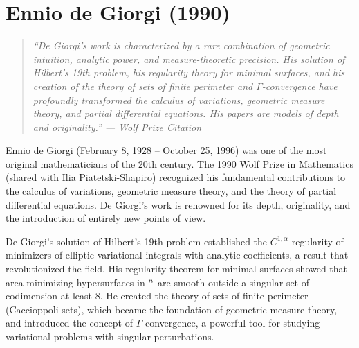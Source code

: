 \let\R\relax
\newcommand{\R}{\mathbb{R}}
\let\C\relax
\newcommand{\C}{\mathbb{C}}
\let\N\relax
\newcommand{\N}{\mathbb{N}}
\let\Z\relax
\newcommand{\Z}{\mathbb{Z}}
\let\Q\relax
\newcommand{\Q}{\mathbb{Q}}
\let\SO\relax
\newcommand{\SO}{\operatorname{SO}}
\let\SL\relax
\newcommand{\SL}{\operatorname{SL}}
\let\GL\relax
\newcommand{\GL}{\operatorname{GL}}
\let\St\relax
\newcommand{\St}{\operatorname{St}}
\let\GV\relax
\newcommand{\GV}{\operatorname{GV}}
\let\E\relax
\newcommand{\E}{\operatorname{E}}
\let\per\relax
\newcommand{\per}{\operatorname{per}}
\let\BV\relax
\newcommand{\BV}{\operatorname{BV}}

\chapter{Ennio de Giorgi (1990)}

\begin{quote}
\it ``De Giorgi's work is characterized by a rare combination of geometric intuition, analytic power, and measure-theoretic precision. His solution of Hilbert's 19th problem, his regularity theory for minimal surfaces, and his creation of the theory of sets of finite perimeter and \(\Gamma\)-convergence have profoundly transformed the calculus of variations, geometric measure theory, and partial differential equations. His papers are models of depth and originality.'' --- Wolf Prize Citation
\end{quote}

Ennio de Giorgi (February 8, 1928 -- October 25, 1996) was one of the most original mathematicians of the 20th century. The 1990 Wolf Prize in Mathematics (shared with Ilia Piatetski-Shapiro) recognized his fundamental contributions to the calculus of variations, geometric measure theory, and the theory of partial differential equations. De Giorgi's work is renowned for its depth, originality, and the introduction of entirely new points of view.

De Giorgi's solution of Hilbert's 19th problem established the \(C^{1,\alpha}\) regularity of minimizers of elliptic variational integrals with analytic coefficients, a result that revolutionized the field. His regularity theorem for minimal surfaces showed that area-minimizing hypersurfaces in \(\R^n\) are smooth outside a singular set of codimension at least 8. He created the theory of sets of finite perimeter (Caccioppoli sets), which became the foundation of geometric measure theory, and introduced the concept of \(\Gamma\)-convergence, a powerful tool for studying variational problems with singular perturbations.

